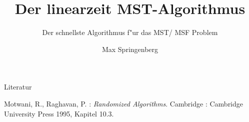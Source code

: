 \documentclass[10pt]{beamer}
\title{Der linearzeit MST-Algorithmus}
\subtitle{Der schnellste Algorithmus f"ur das MST/ MSF Problem}
\date{}
\author{Max Springenberg}
\institute{Proseminar: Randomisierte Algorithmen, TU Dortmund}
\begin{document}
\maketitle



%



%





%




\begin{frame}{Literatur}
    \begin{thebibliography}{}
    \footnotesize
        Motwani, R., Raghavan, P. :
        \textit{Randomized Algorithms}. Cambridge :
        Cambridge University Press 1995, Kapitel 10.3.
    \end{thebibliography}
\end{frame}
\end{document}
